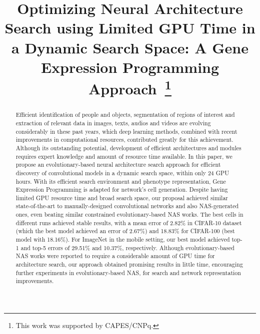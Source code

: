 \documentclass[conference]{IEEEtran}
\begin{document}
	
	\title{Optimizing Neural Architecture Search using Limited GPU Time in a Dynamic Search Space: A Gene Expression Programming Approach\
		\thanks{This work was supported by CAPES/CNPq.}
	}
	
	\author{
		\and
	}
	
	\maketitle
	
	\begin{abstract}
		Efficient identification of people and objects, segmentation of regions of interest and extraction of relevant data in images, texts, audios and videos are evolving considerably in these past years, which deep learning methods, combined with recent improvements in computational resources, contributed greatly for this achievement. Although its outstanding potential, development of efficient architectures and modules requires expert knowledge and amount of resource time available. In this paper, we propose an evolutionary-based neural architecture search approach for efficient discovery of convolutional models in a dynamic search space, within only 24 GPU hours. With its efficient search environment and phenotype representation, Gene Expression Programming is adapted for network's cell generation. Despite having limited GPU resource time and broad search space, our proposal achieved similar state-of-the-art to manually-designed convolutional networks and also NAS-generated ones, even beating similar constrained evolutionary-based NAS works. The best cells in different runs achieved stable results, with a mean error of 2.82\% in CIFAR-10 dataset (which the best model achieved an error of 2.67\%) and 18.83\% for CIFAR-100 (best model with 18.16\%). For ImageNet in the mobile setting, our best model achieved top-1 and top-5 errors of 29.51\% and 10.37\%, respectively. Although evolutionary-based NAS works were reported to require a considerable amount of GPU time for architecture search, our approach obtained promising results in little time, encouraging further experiments in evolutionary-based NAS, for search and network representation improvements.
	\end{abstract}    
	
\end{document}
